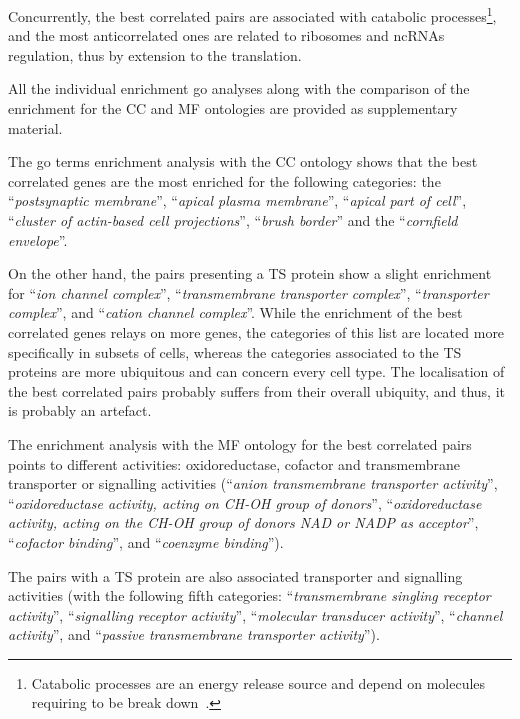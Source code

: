 Concurrently, the best correlated pairs are associated with catabolic processes\footnote{%
Catabolic processes are an energy release source
and depend on molecules requiring to be break down~.},
and the most anticorrelated ones are related to
ribosomes and \glspl{ncRNA} regulation,
thus by extension to the translation.

All the individual enrichment \gls{go} analyses
along with the comparison of the enrichment for the CC and MF ontologies
are provided as supplementary material.

The \gls{go} terms enrichment analysis with the CC ontology shows
that the best correlated genes are the most enriched
for the following categories:
the \enquote{\textit{postsynaptic membrane}},
\enquote{\textit{apical plasma membrane}},
\enquote{\textit{apical part of cell}},
\enquote{\textit{cluster of actin-based cell projections}},
\enquote{\textit{brush border}}
and the \enquote{\textit{cornfield envelope}}.\mybr\

On the other hand, the pairs presenting a \gls{TS} protein
show a slight enrichment for
\enquote{\textit{ion channel complex}},
\enquote{\textit{transmembrane transporter complex}},
\enquote{\textit{transporter complex}},
and \enquote{\textit{cation channel complex}}.
While the enrichment of the best correlated genes relays on more genes,
the categories of this list are located more specifically in subsets of cells,
whereas the categories associated to the \gls{TS} proteins
are more ubiquitous and can concern every cell type.
The localisation of the best correlated pairs probably suffers
from their overall ubiquity,
and thus, it is probably an artefact.

The enrichment analysis with the MF ontology
for the best correlated pairs points to different activities:
oxidoreductase, cofactor and transmembrane transporter or signalling activities
(\enquote{\textit{anion transmembrane transporter activity}},
\enquote{\textit{oxidoreductase activity, acting on CH-OH group of donors}},
\enquote{\textit{oxidoreductase activity, acting on the CH-OH group of donors
NAD or NADP as acceptor}},
\enquote{\textit{cofactor binding}},
and \enquote{\textit{coenzyme binding}}).

The pairs with a \gls{TS} protein are also associated
transporter and signalling activities
(with the following fifth categories:
\enquote{\textit{transmembrane singling receptor activity}},
\enquote{\textit{signalling receptor activity}},
\enquote{\textit{molecular transducer activity}},
\enquote{\textit{channel activity}},
and \enquote{\textit{passive transmembrane transporter activity}}).

